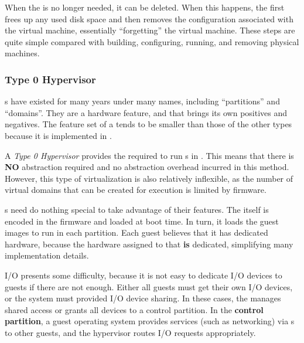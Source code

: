 When the  is no longer needed, it can be deleted.
When this happens, the  first frees up any used disk space and then removes the configuration associated with the virtual machine, essentially ``forgetting'' the virtual machine.
These steps are quite simple compared with building, configuring, running, and removing physical machines.

\subsubsection{Type 0 Hypervisor}\label{subsubsec:Type0_Hypervisor}
s have existed for many years under many names, including ``partitions'' and ``domains''.
They are a hardware feature, and that brings its own positives and negatives.
The feature set of a  tends to be smaller than those of the other types because it is implemented in .

\begin{definition}\label{def:Type0_Hypervisor}
  A \emph{Type 0 Hypervisor} provides the  required to run s in .
  This means that there is \textbf{NO} abstraction required and no abstraction overhead incurred in this method.
  However, this type of virtualization is also relatively inflexible, as the number of virtual domains that can be created for execution is limited by firmware.
\end{definition}

s need do nothing special to take advantage of their features.
The  itself is encoded in the firmware and loaded at boot time.
In turn, it loads the guest images to run in each partition.
Each guest believes that it has dedicated hardware, because the hardware assigned to that  \textbf{is} dedicated, simplifying many implementation details.

I/O presents some difficulty, because it is not easy to dedicate I/O devices to guests if there are not enough.
Either all guests must get their own I/O devices, or the system must provided I/O device sharing.
In these cases, the  manages shared access or grants all devices to a control partition.
In the \textbf{control partition}, a guest operating system provides services (such as networking) via s to other guests, and the hypervisor routes I/O requests appropriately.

